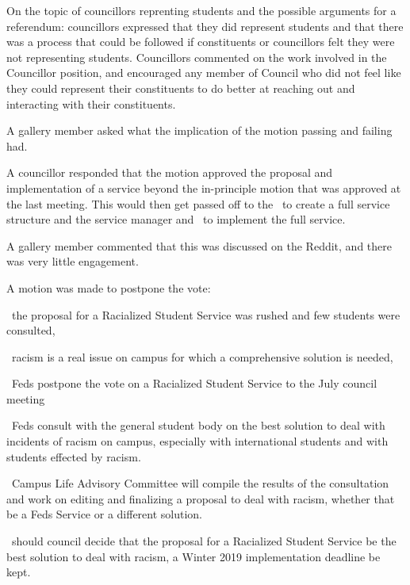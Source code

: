 \begin{motion}
    On the topic of councillors reprenting students and the possible arguments
    for a referendum: councillors expressed that they did represent students
    and that there was a process that could be followed if constituents or
    councillors felt they were not representing students. Councillors
    commented on the work involved in the Councillor position, and encouraged
    any member of Council who did not feel like they could represent their
    constituents to do better at reaching out and interacting with their 
    constituents.

    A gallery member asked what the implication of the motion passing
    and failing had.

    A councillor responded that the motion approved the proposal and
    implementation of a service beyond the in-principle motion that was
    approved at the last meeting. This would then get passed off to the \vpi\
    to create a full service structure and the service manager and \clac\ to
    implement the full service.

    A gallery member commented that this was discussed on the Reddit, and there
    was very little engagement.

    A motion was made to postpone the vote:

    \begin{motion}
        \whereas\ the proposal for a Racialized Student Service was rushed and
        few students were consulted,

        \whereas\ racism is a real issue on campus for which a comprehensive
        solution is needed,

        \birt\ Feds postpone the vote on a Racialized Student Service to the
        July council meeting

        \bifrt\ Feds consult with the general student body on the best solution
        to deal with incidents of racism on campus, especially with
        international students and with students effected by racism.

        \bifrt\ Campus Life Advisory Committee will compile the results of the
        consultation and work on editing and finalizing a proposal to deal with
        racism, whether that be a Feds Service or a different solution.

        \bifrt\ should council decide that the proposal for a Racialized
        Student Service be the best solution to deal with racism, a Winter 2019
        implementation deadline be kept.
        \movers{\alexander}{\harsh}


\end{motion}
\end{motion}
